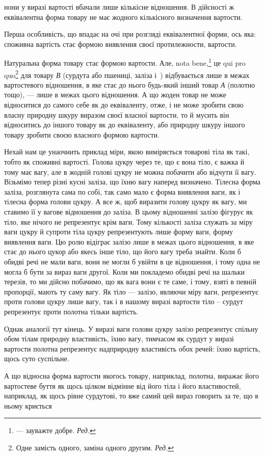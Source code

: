\parcont{}  %
нони у виразі вартості вбачали лише кількісне відношення. В дійсності ж еквівалентна форма товару не
має жодного кількісного визначення вартости.

Перша особливість, що впадає на очі при розгляді еквівалентної форми, ось яка: споживна вартість
стає формою виявлення своєї протилежности, вартости.

Натуральна форма товару стає формою вартости. Але, nota bene,\footnote*{
— зауважте добре. \emph{Ред.}
} це qui pro quo\footnote*{
Одне замість одного, заміна одного другим. \emph{Ред.}
} для товару \emph{В}
(сурдута або пшениці, заліза і~) відбувається лише в межах вартостевого відношення, в яке стає
до нього будь-який інший товар \emph{А} (полотно тощо), — лише в межах цього відношення. А що жоден товар
не може відноситися до самого себе як до еквіваленту, отже, і не може зробити свою власну природну
шкуру виразом своєї власної вартости, то й мусить він відноситись до іншого товару як до
еквіваленту, або природну шкуру іншого товару зробити своєю власного формою вартости.

Нехай нам це унаочнить приклад міри, якою виміряється товарові тіла як такі, тобто як споживні
вартості. Голова цукру через те, що є вона тіло, є важка й тому має вагу, але в жодній голові цукру
не можна побачити або відчути її вагу. Візьмімо тепер різні кусні заліза, що їхню вагу наперед
визначено. Тілесна форма заліза, розглянута сама по собі, так само мало є форма виявлення ваги, як і
тілесна форма голови цукру. А все ж, щоб виразити голову цукру як вагу, ми ставимо її у вагове
відношення до заліза. В цьому відношенні залізо фігурує як тіло, яке нічого не репрезентує крім
ваги. Тому кількості заліза служать за міру ваги цукру й супроти тіла цукру репрезентують лише форму
ваги, форму виявлення ваги. Цю ролю відіграє залізо лише в межах цього відношення, в яке стає до
нього цукор або якесь інше тіло, що його вагу треба знайти. Коли б обидві речі не мали ваги, вони не
могли б увійти в це відношення, і тому одна не могла б бути за вираз ваги другої. Коли ми покладемо
обидві речі на шальки терезів, то ми дійсно побачимо, що як вага вони є те саме, і тому, взяті в
певній пропорції, мають ту саму вагу. Як тіло — залізо, являючи міру ваги, репрезентує проти голови
цукру лише вагу, так і в нашому виразі вартости тіло – сурдут репрезентує проти полотна тільки
вартість.

Однак аналогії тут кінець. У виразі ваги голови цукру залізо репрезентує спільну обом тілам природну
властивість, їхню вагу, тимчасом як сурдут у виразі вартости полотна репрезентує надприродну
властивість обох речей: їхню вартість, щось суто суспільне.

А що відносна форма вартости якогось товару, наприклад,
полотна, виражає його вартостеве буття як щось цілком відмінне від його тіла і його властивостей,
наприклад, як щось рівне сурдутові, то вже самий цей вираз говорить за те, що в ньому криється
\parbreak{}  %
